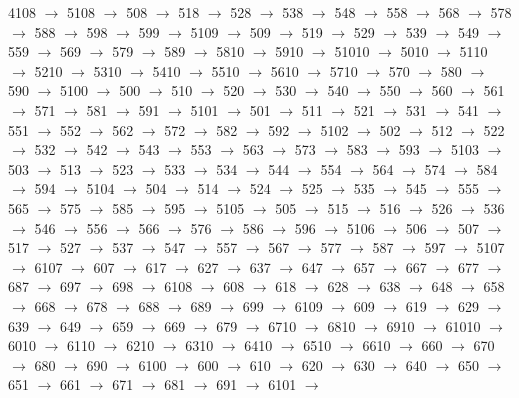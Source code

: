 4108 $\rightarrow$ 5108 $\rightarrow$ 508 $\rightarrow$ 518 $\rightarrow$ 528 $\rightarrow$ 538 $\rightarrow$ 548 $\rightarrow$ 558 $\rightarrow$ 568 $\rightarrow$ 578 $\rightarrow$ 588 $\rightarrow$ 598 $\rightarrow$ 599 $\rightarrow$ 5109 $\rightarrow$ 509 $\rightarrow$ 519 $\rightarrow$ 529 $\rightarrow$ 539 $\rightarrow$ 549 $\rightarrow$ 559 $\rightarrow$ 569 $\rightarrow$ 579 $\rightarrow$ 589 $\rightarrow$ 5810 $\rightarrow$ 5910 $\rightarrow$ 51010 $\rightarrow$ 5010 $\rightarrow$ 5110 $\rightarrow$ 5210 $\rightarrow$ 5310 $\rightarrow$ 5410 $\rightarrow$ 5510 $\rightarrow$ 5610 $\rightarrow$ 5710 $\rightarrow$ 570 $\rightarrow$ 580 $\rightarrow$ 590 $\rightarrow$ 5100 $\rightarrow$ 500 $\rightarrow$ 510 $\rightarrow$ 520 $\rightarrow$ 530 $\rightarrow$ 540 $\rightarrow$ 550 $\rightarrow$ 560 $\rightarrow$ 561 $\rightarrow$ 571 $\rightarrow$ 581 $\rightarrow$ 591 $\rightarrow$ 5101 $\rightarrow$ 501 $\rightarrow$ 511 $\rightarrow$ 521 $\rightarrow$ 531 $\rightarrow$ 541 $\rightarrow$ 551 $\rightarrow$ 552 $\rightarrow$ 562 $\rightarrow$ 572 $\rightarrow$ 582 $\rightarrow$ 592 $\rightarrow$ 5102 $\rightarrow$ 502 $\rightarrow$ 512 $\rightarrow$ 522 $\rightarrow$ 532 $\rightarrow$ 542 $\rightarrow$ 543 $\rightarrow$ 553 $\rightarrow$ 563 $\rightarrow$ 573 $\rightarrow$ 583 $\rightarrow$ 593 $\rightarrow$ 5103 $\rightarrow$ 503 $\rightarrow$ 513 $\rightarrow$ 523 $\rightarrow$ 533 $\rightarrow$ 534 $\rightarrow$ 544 $\rightarrow$ 554 $\rightarrow$ 564 $\rightarrow$ 574 $\rightarrow$ 584 $\rightarrow$ 594 $\rightarrow$ 5104 $\rightarrow$ 504 $\rightarrow$ 514 $\rightarrow$ 524 $\rightarrow$ 525 $\rightarrow$ 535 $\rightarrow$ 545 $\rightarrow$ 555 $\rightarrow$ 565 $\rightarrow$ 575 $\rightarrow$ 585 $\rightarrow$ 595 $\rightarrow$ 5105 $\rightarrow$ 505 $\rightarrow$ 515 $\rightarrow$ 516 $\rightarrow$ 526 $\rightarrow$ 536 $\rightarrow$ 546 $\rightarrow$ 556 $\rightarrow$ 566 $\rightarrow$ 576 $\rightarrow$ 586 $\rightarrow$ 596 $\rightarrow$ 5106 $\rightarrow$ 506 $\rightarrow$ 507 $\rightarrow$ 517 $\rightarrow$ 527 $\rightarrow$ 537 $\rightarrow$ 547 $\rightarrow$ 557 $\rightarrow$ 567 $\rightarrow$ 577 $\rightarrow$ 587 $\rightarrow$ 597 $\rightarrow$ 5107 $\rightarrow$ 6107 $\rightarrow$ 607 $\rightarrow$ 617 $\rightarrow$ 627 $\rightarrow$ 637 $\rightarrow$ 647 $\rightarrow$ 657 $\rightarrow$ 667 $\rightarrow$ 677 $\rightarrow$ 687 $\rightarrow$ 697 $\rightarrow$ 698 $\rightarrow$ 6108 $\rightarrow$ 608 $\rightarrow$ 618 $\rightarrow$ 628 $\rightarrow$ 638 $\rightarrow$ 648 $\rightarrow$ 658 $\rightarrow$ 668 $\rightarrow$ 678 $\rightarrow$ 688 $\rightarrow$ 689 $\rightarrow$ 699 $\rightarrow$ 6109 $\rightarrow$ 609 $\rightarrow$ 619 $\rightarrow$ 629 $\rightarrow$ 639 $\rightarrow$ 649 $\rightarrow$ 659 $\rightarrow$ 669 $\rightarrow$ 679 $\rightarrow$ 6710 $\rightarrow$ 6810 $\rightarrow$ 6910 $\rightarrow$ 61010 $\rightarrow$ 6010 $\rightarrow$ 6110 $\rightarrow$ 6210 $\rightarrow$ 6310 $\rightarrow$ 6410 $\rightarrow$ 6510 $\rightarrow$ 6610 $\rightarrow$ 660 $\rightarrow$ 670 $\rightarrow$ 680 $\rightarrow$ 690 $\rightarrow$ 6100 $\rightarrow$ 600 $\rightarrow$ 610 $\rightarrow$ 620 $\rightarrow$ 630 $\rightarrow$ 640 $\rightarrow$ 650 $\rightarrow$ 651 $\rightarrow$ 661 $\rightarrow$ 671 $\rightarrow$ 681 $\rightarrow$ 691 $\rightarrow$ 6101 $\rightarrow$ 